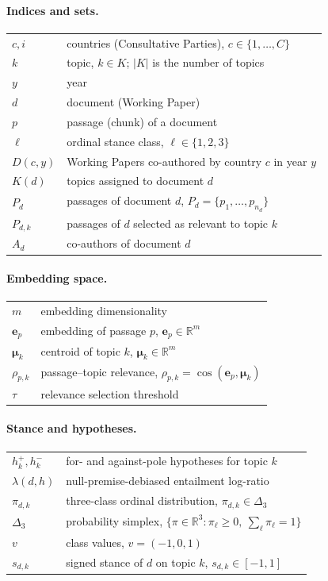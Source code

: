 \paragraph{Indices and sets.}
\begin{tabular}{@{}ll@{}}
$c, i$        & countries (Consultative Parties), $c \in \{1,\dots,C\}$ \\
$k$           & topic, $k \in K$; $|K|$ is the number of topics \\
$y$           & year \\
$d$           & document (Working Paper) \\
$p$           & passage (chunk) of a document \\
$\ell$        & ordinal stance class, $\ell \in \{1,2,3\}$ \\
$D(c,y)$      & Working Papers co-authored by country $c$ in year $y$ \\
$K(d)$        & topics assigned to document $d$ \\
$P_d$         & passages of document $d$, $P_d=\{p_1,\dots,p_{n_d}\}$ \\
$P_{d,k}$     & passages of $d$ selected as relevant to topic $k$ \\
$A_d$         & co-authors of document $d$ \\
\end{tabular}

\paragraph{Embedding space.}
\begin{tabular}{@{}ll@{}}
$m$                  & embedding dimensionality \\
$\mathbf{e}_p$       & embedding of passage $p$, $\mathbf{e}_p \in \mathbb{R}^{m}$ \\
$\boldsymbol{\mu}_k$ & centroid of topic $k$, $\boldsymbol{\mu}_k \in \mathbb{R}^{m}$ \\
$\rho_{p,k}$         & passage--topic relevance, $\rho_{p,k}=\cos(\mathbf{e}_p,\boldsymbol{\mu}_k)$ \\
$\tau$               & relevance selection threshold \\
\end{tabular}

\paragraph{Stance and hypotheses.}
\begin{tabular}{@{}ll@{}}
$h_k^{+}, h_k^{-}$ & for- and against-pole hypotheses for topic $k$ \\
$\lambda(d,h)$  & null-premise-debiased entailment log-ratio \\
$\pi_{d,k}$     & three-class ordinal distribution, $\pi_{d,k}\in\Delta_3$ \\
$\Delta_3$      & probability simplex, $\{\pi\in\mathbb{R}^3 : \pi_\ell\ge 0,\ \sum_\ell \pi_\ell = 1\}$ \\
$v$             & class values, $v=(-1,0,1)$ \\
$s_{d,k}$       & signed stance of $d$ on topic $k$, $s_{d,k}\in[-1,1]$ \\
\end{tabular}

